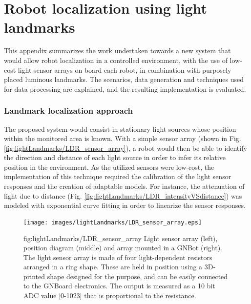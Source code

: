 \chapter{Robot localization using light landmarks}
\label{Appendix:lightLandmarks}
\vspace{-1cm}



This appendix summarizes the work undertaken towards a new system that would allow robot localization in a controlled environment, with the use of low-cost light sensor arrays on board each robot, in combination with purposely placed luminous landmarks.
The scenarios, data generation and techniques used for data processing are explained, and the resulting implementation is evaluated.


\subsection*{Landmark localization approach}

The proposed system would consist in stationary light sources whose position within the monitored area is known.
With a simple sensor array (shown in Fig. \ref{fig:lightLandmarks/LDR_sensor_array}), a robot would then be able to identify the direction and distance of each light source in order to infer its relative position in the environment.
As the utilized sensors were low-cost, the implementation of this technique required the calibration of the light sensor responses and the creation of adaptable models. For instance, the attenuation of light due to distance (Fig. \ref{fig:lightLandmarks/LDR_intensityVSdistance}) was modeled with exponential curve fitting in order to linearize the sensor responses.









\begin{figure}[h!]
\centerline{\mbox{\texttt{[image: images/lightLandmarks/LDR\_sensor\_array.eps]}}}
{fig:lightLandmarks/LDR_sensor_array}{
Light sensor array (left), position diagram (middle) and array mounted in a GNBot (right).
The light sensor array is made of four light-dependent resistors arranged in a ring shape. These are held in position using a 3D-printed shape designed for the purpose, and can be easily connected to the GNBoard electronics. The output is measured as a 10 bit ADC value [0-1023] that is proportional to the resistance.
}\end{figure}






